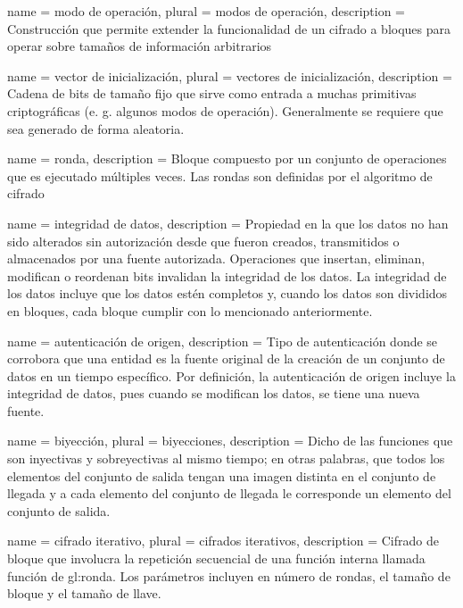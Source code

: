 %
%
%

\makeglossaries

{
  name = modo de operación,
  plural = modos de operación,
  description = {
    Construcción que permite extender la funcionalidad de un cifrado a bloques
    para operar sobre tamaños de información arbitrarios%
  }
}

{
  name = vector de inicialización,
  plural = vectores de inicialización,
  description = {
    Cadena de bits de tamaño fijo que sirve como entrada a muchas primitivas
    criptográficas (e. g. algunos modos de operación). Generalmente se requiere
    que sea generado de forma aleatoria.
  }
}

{
  name = ronda,
  description = {
    Bloque compuesto por un conjunto de operaciones que es ejecutado
    múltiples veces. Las rondas son definidas por el algoritmo de cifrado%
  }
}

{
  name = integridad de datos,
  description = {
    Propiedad en la que los datos no han sido alterados sin autorización desde
    que fueron creados, transmitidos o almacenados por una fuente autorizada.
    Operaciones que insertan, eliminan, modifican o reordenan bits invalidan
    la integridad de los datos. La integridad de los datos incluye que los
    datos estén completos y, cuando los datos son divididos en bloques, cada
    bloque cumplir con lo mencionado anteriormente.
  }
}

{
  name = autenticación de origen,
  description = {
    Tipo de autenticación donde se corrobora que una entidad es la fuente
    original de la creación de un conjunto de datos en un tiempo específico.
    Por definición, la autenticación de origen incluye la integridad de datos,
    pues cuando se modifican los datos, se tiene una nueva fuente.
  }
}

{
  name = biyección,
  plural = biyecciones,
  description = {
    Dicho de las funciones que son inyectivas y sobreyectivas
    al mismo tiempo; en otras palabras, que todos los elementos
    del conjunto de salida tengan una imagen distinta en el conjunto
    de llegada y a cada elemento del conjunto de llegada le corresponde
    un elemento del conjunto de salida.
  }
}

{
  name = cifrado iterativo,
  plural = cifrados iterativos,
  description = {
    Cifrado de bloque que involucra la repetición secuencial de
    una función interna llamada función de \gls{gl:ronda}. Los
    parámetros incluyen en número de rondas, el tamaño de bloque y
    el tamaño de llave.
  }
}
